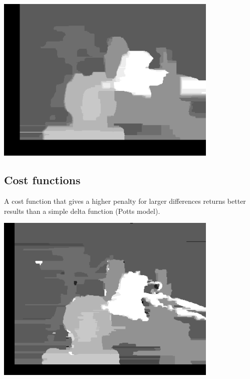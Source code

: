\documentclass[a4paper]{scrartcl}
\begin{document}
\vspace{1cm}
\begin{minipage}{0.8\textwidth}
  \centering
  \includegraphics[width=0.8\textwidth]{images/window_size-15.png}
\end{minipage}


\subsection{Cost functions}

A cost function that gives a higher penalty for larger differences
returns better results than a simple delta function (Potts model).

\vspace{1cm}
\begin{minipage}{0.8\textwidth}
  \centering
  \includegraphics[width=0.8\textwidth]{images/potts.png}
\end{minipage}
\end{document}
